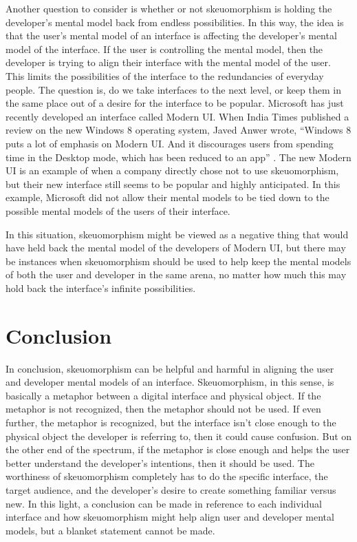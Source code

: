 \documentclass{article}
\begin{document}
Another question to consider is whether or not skeuomorphism is holding the developer's mental model back from endless possibilities. In this way, the idea is that the user's mental model of an interface is affecting the developer's mental model of the interface. If the user is controlling the mental model, then the developer is trying to align their interface with the mental model of the user. This limits the possibilities of the interface to the redundancies of everyday people. The question is, do we take interfaces to the next level, or keep them in the same place out of a desire for the interface to be popular. Microsoft has just recently developed an interface called Modern UI.  When India Times published a review on the new Windows 8 operating system, Javed Anwer  wrote, ``Windows 8 puts a lot of emphasis on Modern UI. And it discourages users from spending time in the Desktop mode, which has been reduced to an app'' \cite{anwer}. The new Modern UI is an example of when a company directly chose not to use skeuomorphism, but their new interface still seems to be popular and highly anticipated. In this example, Microsoft did not allow their mental models to be tied down to the possible mental models of the users of their interface.

In this situation, skeuomorphism might be viewed as a negative thing that would have held back the mental model of the developers of Modern UI, but there may be instances when skeuomorphism should be used to help keep the mental models of both the user and developer in the same arena, no matter how much this may hold back the interface's infinite possibilities.

\section{Conclusion}

In conclusion, skeuomorphism can be helpful and harmful in aligning the user and developer mental models of an interface. Skeuomorphism, in this sense, is basically a metaphor between a digital interface and physical object. If the metaphor is not recognized, then the metaphor should not be used. If even further, the metaphor is recognized, but the interface isn't close enough to the physical object the developer is referring to, then it could cause confusion. But on the other end of the spectrum, if the metaphor is close enough and helps the user better understand the developer's intentions, then it should be used. The worthiness of skeuomorphism completely has to do the specific interface, the target audience, and the developer's desire to create something familiar versus new. In this light, a conclusion can be made in reference to each individual interface and how skeuomorphism might help align user and developer mental models, but a blanket statement cannot be made.

\pagebreak


\end{document}

